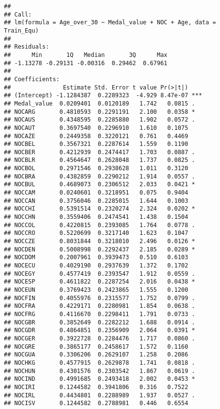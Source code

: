 \documentclass[]{article}
\begin{document}
\begin{verbatim}
## 
## Call:
## lm(formula = Age_over_30 ~ Medal_value + NOC + Age, data = Train_Equ)
## 
## Residuals:
##      Min       1Q   Median       3Q      Max 
## -1.13278 -0.29131 -0.00316  0.29462  0.67961 
## 
## Coefficients:
##               Estimate Std. Error t value Pr(>|t|)    
## (Intercept) -1.1284387  0.2289323  -4.929 8.47e-07 ***
## Medal_value  0.0209401  0.0120189   1.742   0.0815 .  
## NOCARG       0.4810593  0.2291191   2.100   0.0358 *  
## NOCAUS       0.4348595  0.2285880   1.902   0.0572 .  
## NOCAUT       0.3697540  0.2296910   1.610   0.1075    
## NOCAZE       0.2449358  0.3220121   0.761   0.4469    
## NOCBEL       0.3567321  0.2287614   1.559   0.1190    
## NOCBER       0.4212939  0.2474417   1.703   0.0887 .  
## NOCBLR       0.4564647  0.2628048   1.737   0.0825 .  
## NOCBOL       0.2971546  0.2938628   1.011   0.3120    
## NOCBRA       0.4382859  0.2290212   1.914   0.0557 .  
## NOCBUL       0.4689073  0.2306512   2.033   0.0421 *  
## NOCCAM       0.0240601  0.3218951   0.075   0.9404    
## NOCCAN       0.3756046  0.2285015   1.644   0.1003    
## NOCCHI       0.5391514  0.2320274   2.324   0.0202 *  
## NOCCHN       0.3559406  0.2474541   1.438   0.1504    
## NOCCOL       0.4220815  0.2393085   1.764   0.0778 .  
## NOCCRO       0.5220699  0.3217140   1.623   0.1047    
## NOCCZE       0.8031844  0.3218010   2.496   0.0126 *  
## NOCDEN       0.5008998  0.2292437   2.185   0.0289 *  
## NOCDOM       0.2007961  0.3939473   0.510   0.6103    
## NOCECU       0.4029190  0.2937639   1.372   0.1702    
## NOCEGY       0.4577419  0.2393547   1.912   0.0559 .  
## NOCESP       0.4611822  0.2287254   2.016   0.0438 *  
## NOCEUN       0.3769423  0.2423865   1.555   0.1200    
## NOCFIN       0.4055976  0.2315577   1.752   0.0799 .  
## NOCFRA       0.4229171  0.2280981   1.854   0.0638 .  
## NOCFRG       0.4116670  0.2298411   1.791   0.0733 .  
## NOCGBR       0.3852649  0.2282212   1.688   0.0914 .  
## NOCGDR       0.4864851  0.2356909   2.064   0.0391 *  
## NOCGER       0.3922728  0.2284476   1.717   0.0860 .  
## NOCGRE       0.3865177  0.2458617   1.572   0.1160    
## NOCGUA       0.3306206  0.2629107   1.258   0.2086    
## NOCHKG       0.4577915  0.2629878   1.741   0.0818 .  
## NOCHUN       0.4301576  0.2303542   1.867   0.0619 .  
## NOCIND       0.4991685  0.2493418   2.002   0.0453 *  
## NOCIRI       0.1244582  0.3941806   0.316   0.7522    
## NOCIRL       0.4434801  0.2288989   1.937   0.0527 .  
## NOCISV       0.1244582  0.2788981   0.446   0.6554    

\end{verbatim}
\end{document}

